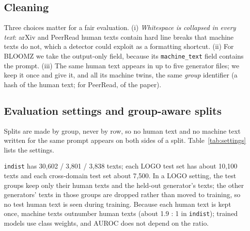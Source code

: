 \documentclass[11pt,a4paper]{article}
\begin{document}
\subsection{Cleaning}
Three choices matter for a fair evaluation. (i) \emph{Whitespace is collapsed in every text}: arXiv and PeerRead human
texts contain hard line breaks that machine texts do not, which a detector could exploit as a formatting shortcut.
(ii) For BLOOMZ we take the output-only field, because its \texttt{machine\_text} field contains the prompt.
(iii) The same human text appears in up to five generator files; we keep it once and give it, and all its machine
twins, the same \emph{group} identifier (a hash of the human text; for PeerRead, of the paper).

\subsection{Evaluation settings and group-aware splits}
Splits are made by group, never by row, so no human text and no machine text written for the same prompt appears on
both sides of a split. Table~\ref{tab:settings} lists the settings.

\begin{table}
  \caption{Evaluation settings. All splits are by group. Sizes from \texttt{results/data\_audit.md}.}
  \label{tab:settings}
\end{table}

\texttt{indist} has 30,602 / 3,801 / 3,838 texts; each LOGO test set has about 10,100 texts and each cross-domain
test set about 7,500. In a LOGO setting, the test groups keep only their human texts and the held-out generator's
texts; the other generators' texts in those groups are dropped rather than moved to training, so no test human text is
seen during training. Because each human text is kept once, machine texts outnumber human texts (about 1.9 : 1 in
\texttt{indist}); trained models use class weights, and AUROC does not depend on the ratio.
\end{document}
